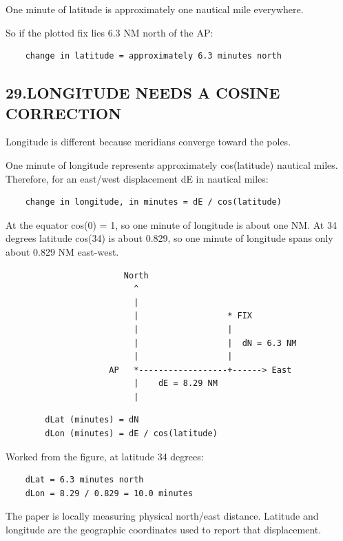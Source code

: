 \documentclass[11pt]{article}
\begin{document}
One minute of latitude is approximately one nautical mile everywhere.

So if the plotted fix lies 6.3 NM north of the AP:

\begin{verbatim}
    change in latitude = approximately 6.3 minutes north
\end{verbatim}

\subsection*{29.\quad LONGITUDE NEEDS A COSINE CORRECTION}

Longitude is different because meridians converge toward the poles.

One minute of longitude represents approximately cos(latitude) nautical miles. Therefore, for an east/west displacement dE in nautical miles:

\begin{verbatim}
    change in longitude, in minutes = dE / cos(latitude)
\end{verbatim}

At the equator cos(0) = 1, so one minute of longitude is about one NM. At 34 degrees latitude cos(34) is about 0.829, so one minute of longitude spans only about 0.829 NM east-west.

\begin{verbatim}
                        North
                          ^
                          |
                          |                  * FIX
                          |                  |
                          |                  |  dN = 6.3 NM
                          |                  |
                     AP   *------------------+------> East
                          |    dE = 8.29 NM
                          |
\end{verbatim}

\begin{verbatim}
        dLat (minutes) = dN
        dLon (minutes) = dE / cos(latitude)
\end{verbatim}

Worked from the figure, at latitude 34 degrees:

\begin{verbatim}
    dLat = 6.3 minutes north
    dLon = 8.29 / 0.829 = 10.0 minutes
\end{verbatim}

The paper is locally measuring physical north/east distance. Latitude and longitude are the geographic coordinates used to report that displacement.
\end{document}
